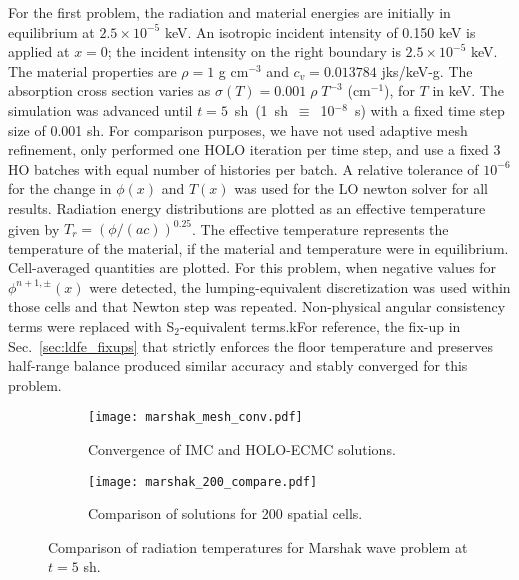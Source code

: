 For the first problem, the radiation and material energies are initially in
equilibrium at $2.5\times 10^{-5}$ keV.   An isotropic incident intensity of 0.150 keV is applied
at $x=0$; the incident intensity on the right boundary is $2.5\times10^{-5}$ keV.
The material properties are $\rho = 1$ g cm$^{-3}$ and $c_v = 0.013784$ jks/keV-g. The
absorption cross section varies as $\sigma(T) = 0.001\;\rho\; T^{-3}$ (cm$^{-1}$), for $T$
in keV.
The simulation was advanced until $t=5$~sh~(1~sh~$\equiv$~10$^{-8}$~s) with a fixed time step size of 0.001 sh. For comparison purposes, we
have not used adaptive mesh
refinement, only performed one HOLO iteration per time
step, and use a fixed 3 HO batches with equal number of histories per batch. A
relative tolerance of $10^{-6}$ for the change in $\phi(x)$ and $T(x)$ was used for
the LO newton solver for all results. Radiation energy
distributions are plotted as an effective temperature given by
$T_r=(\phi/(ac))^{0.25}$.  The effective temperature represents the temperature of the
material, if the material and temperature were in equilibrium.  Cell-averaged quantities are plotted.
For this problem, when negative values for $\phi^{n+1,\pm}(x)$ were detected, the lumping-equivalent
discretization was used within those cells and that Newton step was repeated.
Non-physical angular consistency terms were replaced with S$_2$-equivalent terms.kFor
reference, the fix-up in Sec.~\ref{sec:ldfe_fixups} that strictly enforces the floor temperature and preserves half-range
balance produced similar accuracy and stably converged for this problem.
\begin{figure}[hp]
    \centering
\begin{subfigure}{0.7\textwidth}
  \centering
    \texttt{[image: marshak\_mesh\_conv.pdf]}
    \caption{\label{marshak_mesh_conv} Convergence of IMC and HOLO-ECMC solutions.}
\end{subfigure}
\begin{subfigure}{0.7\textwidth}
  \centering
  \texttt{[image: marshak\_200\_compare.pdf]}
  \caption{\label{marshak_200_compare}  Comparison of solutions for 200 spatial cells. }
\end{subfigure}
\caption{Comparison of radiation temperatures for Marshak wave problem at ${t=5}$ sh.}
\end{figure}

